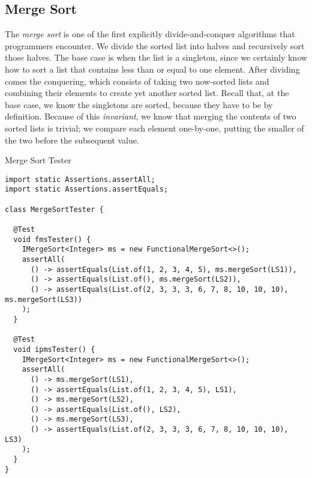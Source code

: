 \subsection*{Merge Sort}

The \textit{merge sort} is one of the first explicitly divide-and-conquer algorithms that programmers encounter. We divide the sorted list into halves and recursively sort those halves. The base case is when the list is a singleton, since we certainly know how to sort a list that contains less than or equal to one element. After dividing comes the conquering, which consists of taking two now-sorted lists and combining their elements to create yet another sorted list. Recall that, at the base case, we know the singletons are sorted, because they have to be by definition. Because of this \textit{invariant}, we know that merging the contents of two sorted lists is trivial; we compare each element one-by-one, putting the smaller of the two before the subsequent value.


\begin{cl}{Merge Sort Tester}
\begin{lstlisting}[language=MyJava]
import static Assertions.assertAll;
import static Assertions.assertEquals;

class MergeSortTester {

  @Test
  void fmsTester() {
    IMergeSort<Integer> ms = new FunctionalMergeSort<>();
    assertAll(
      () -> assertEquals(List.of(1, 2, 3, 4, 5), ms.mergeSort(LS1)),
      () -> assertEquals(List.of(), ms.mergeSort(LS2)),
      () -> assertEquals(List.of(2, 3, 3, 3, 6, 7, 8, 10, 10, 10), ms.mergeSort(LS3))
    );
  }

  @Test
  void ipmsTester() {
    IMergeSort<Integer> ms = new FunctionalMergeSort<>();
    assertAll(
      () -> ms.mergeSort(LS1),
      () -> assertEquals(List.of(1, 2, 3, 4, 5), LS1),
      () -> ms.mergeSort(LS2),
      () -> assertEquals(List.of(), LS2),
      () -> ms.mergeSort(LS3),
      () -> assertEquals(List.of(2, 3, 3, 3, 6, 7, 8, 10, 10, 10), LS3)
    );
  }
}
\end{lstlisting}
\end{cl}
  
